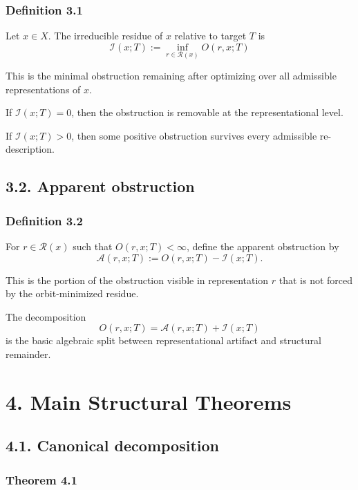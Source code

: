 \documentclass[
]{article}
\begin{document}
\subsubsection{Definition 3.1}\label{definition-3.1}

Let \(x \in X\). The irreducible residue of \(x\) relative to target
\(T\) is \[
\boxed{
\mathcal{I}(x;T) := \inf_{r \in \mathcal{R}(x)} O(r,x;T)
}
\]

This is the minimal obstruction remaining after optimizing over all
admissible representations of \(x\).

If \(\mathcal{I}(x;T) = 0\), then the obstruction is removable at the
representational level.

If \(\mathcal{I}(x;T) > 0\), then some positive obstruction survives
every admissible re-description.

\subsection{3.2. Apparent obstruction}\label{apparent-obstruction}

\subsubsection{Definition 3.2}\label{definition-3.2}

For \(r \in \mathcal{R}(x)\) such that \(O(r,x;T) < \infty\), define the
apparent obstruction by \[
\mathcal{A}(r,x;T) := O(r,x;T) - \mathcal{I}(x;T).
\]

This is the portion of the obstruction visible in representation \(r\)
that is not forced by the orbit-minimized residue.

The decomposition \[
O(r,x;T) = \mathcal{A}(r,x;T) + \mathcal{I}(x;T)
\] is the basic algebraic split between representational artifact and
structural remainder.

\section{4. Main Structural Theorems}\label{main-structural-theorems}

\subsection{4.1. Canonical decomposition}\label{canonical-decomposition}

\subsubsection{Theorem 4.1}\label{theorem-4.1}
\end{document}
